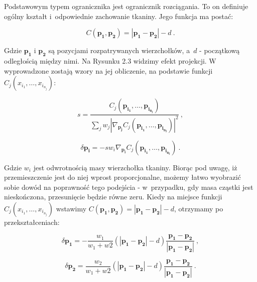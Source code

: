 			
			Podstawowym typem ogranicznika jest ogranicznik rozciągania. To on definiuje ogólny kształt i~odpowiednie zachowanie tkaniny. Jego funkcja ma postać:
			
			\begin{equation}
			C(\mathbf{p_{1}}, \mathbf{p_{2}}) = |\mathbf{p_{1}} - \mathbf{p_{2}}| - d \ .		
			\end{equation}
			
			Gdzie \( \mathbf{p_{1}} \) i \( \mathbf{p_{2}} \) są pozycjami rozpatrywanych wierzchołków, a~\(d\) - początkową odległością między nimi. Na Rysunku 2.3 widzimy efekt projekcji. W~\cite{posbased} wyprowadzone zostają wzory na jej obliczenie, na podstawie funkcji \( C_{j}(x_{i_{1}}, \dots, x_{i_{n_{j}}} ) \):
			
			\begin{equation}
			s = \frac{C_{j}(\mathbf{p_{i_{1}}}, \dots, \mathbf{p_{i_{n_{j}}}} )}{ \sum _{j} w_{j} | \nabla _{\mathbf{p_{j}}} C_{j}(\mathbf{p_{i_{1}}}, \dots, \mathbf{p_{i_{n_{j}}}} ) | ^{2} } \ ,		
			\end{equation}
			
			\begin{equation}
			\delta \mathbf{p_{i}} = -sw_{i} \nabla _{\mathbf{p_{i}}} C_{j}(\mathbf{p_{i_{1}}}, \dots, \mathbf{p_{i_{n_{j}}}} ) \ .
			\end{equation}
			
			Gdzie \(w_{i}\) jest odwrotnością masy wierzchołka tkaniny. Biorąc pod uwagę, iż przemieszczenie jest do niej wprost proporcjonalne, możemy łatwo wyobrazić sobie dowód na poprawność tego podejścia - w~przypadku, gdy masa cząstki jest nieskończona, przesunięcie będzie równe zeru. Kiedy na miejsce funkcji \(C_{j}(x_{i_{1}}, \dots, x_{i_{n_{j}}} ) \) wstawimy \(C(\mathbf{p_{1}}, \mathbf{p_{2}}) = |\mathbf{p_{1}} - \mathbf{p_{2}}| - d\), otrzymamy po przekształceniach: 
			
			\begin{equation}
			\delta \mathbf{p_{1}} = - \frac{w_{1}}{w_{1} + w{2}} (|\mathbf{p_{1}} - \mathbf{p_{2}}| - d) \frac{\mathbf{p_{1}} - \mathbf{p_{2}}}{|\mathbf{p_{1}} - \mathbf{p_{2}}|} \ ,
			\end{equation}
			
			\begin{equation}
			\delta \mathbf{p_{2}} = \frac{w_{2}}{w_{1} + w{2}} (|\mathbf{p_{1}} - \mathbf{p_{2}}| - d) \frac{\mathbf{p_{1}} - \mathbf{p_{2}}}{|\mathbf{p_{1}} - \mathbf{p_{2}}|} \ .
			\end{equation}
			
